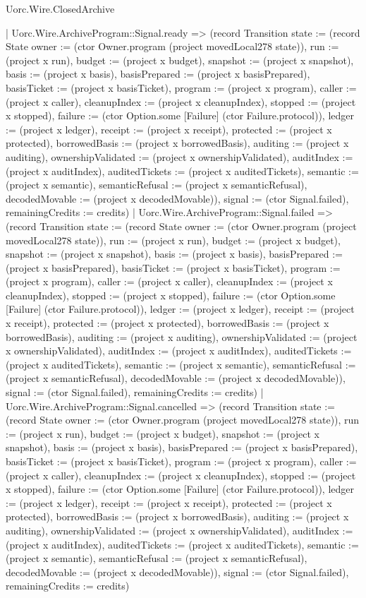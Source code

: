 \begin{lexlean}{Uorc.Wire.ClosedArchive}
\begin{semanticmodule}
{        | Uorc.Wire.ArchiveProgram::Signal.ready => (record Transition {state := (record State {owner := (ctor Owner.program (project movedLocal278 state)), run := (project x run), budget := (project x budget), snapshot := (project x snapshot), basis := (project x basis), basisPrepared := (project x basisPrepared), basisTicket := (project x basisTicket), program := (project x program), caller := (project x caller), cleanupIndex := (project x cleanupIndex), stopped := (project x stopped), failure := (ctor Option.some [Failure] (ctor Failure.protocol)), ledger := (project x ledger), receipt := (project x receipt), protected := (project x protected), borrowedBasis := (project x borrowedBasis), auditing := (project x auditing), ownershipValidated := (project x ownershipValidated), auditIndex := (project x auditIndex), auditedTickets := (project x auditedTickets), semantic := (project x semantic), semanticRefusal := (project x semanticRefusal), decodedMovable := (project x decodedMovable)}), signal := (ctor Signal.failed), remainingCredits := credits})
        | Uorc.Wire.ArchiveProgram::Signal.failed => (record Transition {state := (record State {owner := (ctor Owner.program (project movedLocal278 state)), run := (project x run), budget := (project x budget), snapshot := (project x snapshot), basis := (project x basis), basisPrepared := (project x basisPrepared), basisTicket := (project x basisTicket), program := (project x program), caller := (project x caller), cleanupIndex := (project x cleanupIndex), stopped := (project x stopped), failure := (ctor Option.some [Failure] (ctor Failure.protocol)), ledger := (project x ledger), receipt := (project x receipt), protected := (project x protected), borrowedBasis := (project x borrowedBasis), auditing := (project x auditing), ownershipValidated := (project x ownershipValidated), auditIndex := (project x auditIndex), auditedTickets := (project x auditedTickets), semantic := (project x semantic), semanticRefusal := (project x semanticRefusal), decodedMovable := (project x decodedMovable)}), signal := (ctor Signal.failed), remainingCredits := credits})
        | Uorc.Wire.ArchiveProgram::Signal.cancelled => (record Transition {state := (record State {owner := (ctor Owner.program (project movedLocal278 state)), run := (project x run), budget := (project x budget), snapshot := (project x snapshot), basis := (project x basis), basisPrepared := (project x basisPrepared), basisTicket := (project x basisTicket), program := (project x program), caller := (project x caller), cleanupIndex := (project x cleanupIndex), stopped := (project x stopped), failure := (ctor Option.some [Failure] (ctor Failure.protocol)), ledger := (project x ledger), receipt := (project x receipt), protected := (project x protected), borrowedBasis := (project x borrowedBasis), auditing := (project x auditing), ownershipValidated := (project x ownershipValidated), auditIndex := (project x auditIndex), auditedTickets := (project x auditedTickets), semantic := (project x semantic), semanticRefusal := (project x semanticRefusal), decodedMovable := (project x decodedMovable)}), signal := (ctor Signal.failed), remainingCredits := credits})
}
\end{semanticmodule}
\end{lexlean}
